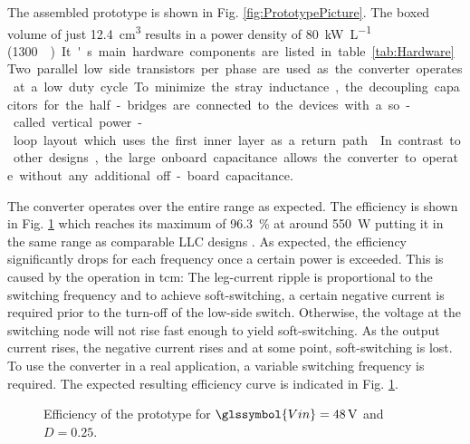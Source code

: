 \documentclass{IPEC2026}
\newcommand{\sbl}[1]{\glssymbol{#1}}
\newcommand{\ac}{\gls}
\begin{document}
The assembled prototype is shown in Fig. \ref{fig:PrototypePicture}. The boxed volume of just \qty{12.4}{\cubic\cm} results in a power density of \qty{80}{\kW\per\liter} (\qty{1300}{\W\per\cubic\inch}). It's main hardware components are listed in table \ref{tab:Hardware}. Two parallel low side transistors per phase are used as the converter operates at a low duty cycle. To minimize the stray inductance, the decoupling capacitors for the half-bridges are connected to the devices with a so-called vertical power-loop layout which uses the first inner layer as a return path \cite{reuschUnderstandingEffectPCB2014}. In contrast to other designs, the large onboard capacitance allows the converter to operate without any additional off-board capacitance. \par
The converter operates over the entire range as expected. The efficiency is shown in Fig. \ref{fig:Efficiency} which reaches its maximum of \qty{96.3}{\percent} at around \qty{550}{\W} putting it in the same range as comparable LLC designs \cite{caiOptimalDesignMegahertz2020, ahmedLowLossIntegratedInductor2020}. As expected, the efficiency significantly drops for each frequency once a certain power is exceeded. This is caused by the operation in \ac{tcm}: The leg-current ripple is proportional to the switching frequency and to achieve soft-switching, a certain negative current is required prior to the turn-off of the low-side switch. Otherwise, the voltage at the switching node will not rise fast enough to yield soft-switching. As the output current rises, the negative current rises and at some point, soft-switching is lost. %
To use the converter in a real application, a variable switching frequency is required. The expected resulting efficiency curve is indicated in Fig. \ref{fig:Efficiency}.

\begin{figure}
  \centering
  
  \caption{Efficiency of the prototype for $\sbl{Vin}=\qty{48}{\V}$ and $D=0.25$.}
  \label{fig:Efficiency}
\end{figure}
\end{document}
